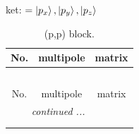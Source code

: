 \documentclass[fleqn,8pt,landscape]{jsarticle}
\begin{document}
\noindent
ket: $=\ket{p_{x}}, \ket{p_{y}}, \ket{p_{z}}$
\renewcommand{\arraystretch}{1.6}
\begin{longtable}{ccc}
\caption{(p,p) block.}
 \\
 \hline \hline
No. & multipole & matrix \\ \hline \endfirsthead

\multicolumn{2}{l}{\tablename\ \thetable{}} \\
 \hline \hline
No. & multipole & matrix \\ \hline \endhead

 \hline \hline
\multicolumn{2}{r}{\footnotesize\it continued ...} \\ \endfoot

 \hline \hline
\multicolumn{2}{r}{} \\ \endlastfoot


\end{longtable}
\end{document}
